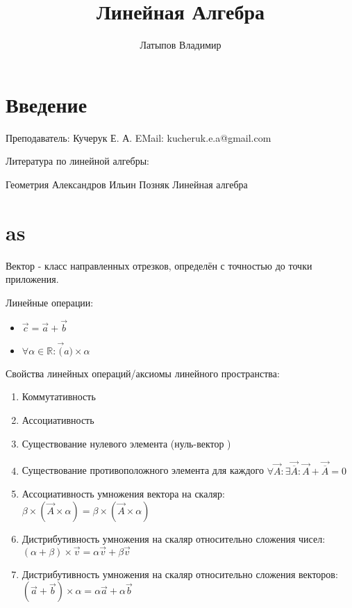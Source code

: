 \documentclass[12pt, a4paper]{article}
\title{Линейная Алгебра}
\author{Латыпов Владимир}
\begin{document}
    \maketitle
    \newpage
    \tableofcontents
    \newpage

    \section{Введение}
    Преподаватель: Кучерук Е. А. 
    EMail: kucheruk.e.a@gmail.com

    Литература по линейной алгебры:

    Геометрия Александров
    Ильин Позняк  Линейная алгебра

    \section{as}
    
    Вектор - класс направленных отрезков, определён с точностью до точки приложения.

    Линейные операции:
    \begin{itemize}
        \item $\vec{c} = \vec{a} + \vec{b}$
        \item $\forall \alpha \in \mathbb{R}: \vec(a) \times \alpha$
    \end{itemize}

    Свойства линейных операций/аксиомы линейного пространства:
    \begin{enumerate}
        \item Коммутативность
        \item Ассоциативность
        \item Существование нулевого элемента (нуль-вектор  )
        \item Существование противоположного элемента для каждого 
                $\forall \vec{A}: \exists \vec{\overline{A}}: \vec{A} + \vec{\overline{A}} = 0$
        \item Ассоциативность умножения вектора на скаляр: $\beta \times (\vec{A} \times \alpha) = \beta \times (\vec{A} \times \alpha)$
        \item Дистрибутивность умножения на скаляр относительно сложения чисел: $(\alpha + \beta) \times \vec{v}  = \alpha \vec{v} + \beta \vec{v}$
        \item Дистрибутивность умножения на скаляр относительно сложения векторов: $(\vec{a} + \vec{b}) \times \alpha  = \alpha \vec{a} + \alpha \vec{b}$
    \end{enumerate}
    
\end{document}
